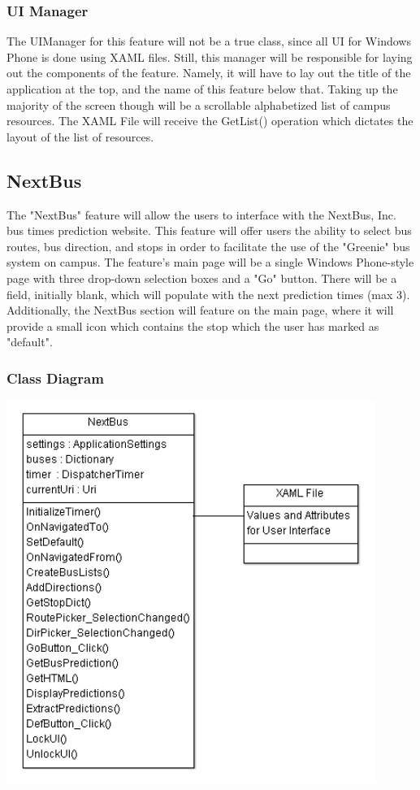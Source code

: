 \documentclass[pdftex,12pt,letter]{article}
\begin{document}
\subsubsection{UI Manager}
The UIManager for this feature will not be a true class, since all UI for Windows Phone is done using XAML files. Still, this manager will be responsible for laying out the components of the feature. Namely, it will have to lay out the title of the application at the top, and the name of this feature below that. Taking up the majority of the screen though will be a scrollable alphabetized list of campus resources. The XAML File will receive the GetList() operation which dictates the layout of the list of resources.
\subsection{NextBus}
The "NextBus" feature will allow the users to interface with the NextBus, Inc. bus times prediction website. This feature will offer users the ability to select bus routes, bus direction, and stops in order to facilitate the use of the "Greenie" bus system on campus. The feature's main page will be a single Windows Phone-style page with three drop-down selection boxes and a "Go" button. There will be a field, initially blank, which will populate with the next prediction times (max 3). Additionally, the NextBus section will feature on the main page, where it will provide a small icon which contains the stop which the user has marked as "default".
\subsubsection{Class Diagram}
\begin{flushleft}
\includegraphics[width=120mm]{nextbusCD.png}
\end{flushleft}
\end{document}
